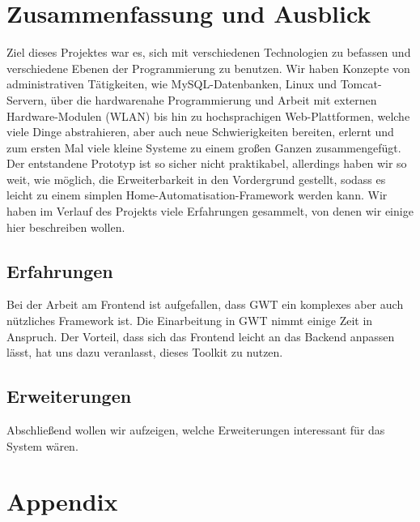 \documentclass[12pt,a4paper,twoside]{article}
\newcommand{\labelSec}[1]{\label{sec:#1}}
\begin{document}
\section{Zusammenfassung und Ausblick} \labelSec{ausblick}
Ziel dieses Projektes war es, sich mit verschiedenen Technologien zu befassen und verschiedene Ebenen der Programmierung zu benutzen. Wir haben Konzepte von administrativen Tätigkeiten, wie MySQL-Datenbanken, Linux und Tomcat-Servern, über die hardwarenahe Programmierung und Arbeit mit externen Hardware-Modulen (WLAN) bis hin zu hochsprachigen Web-Plattformen, welche viele Dinge abstrahieren, aber auch neue Schwierigkeiten bereiten, erlernt und zum ersten Mal viele kleine Systeme zu einem großen Ganzen zusammengefügt. Der entstandene Prototyp ist so sicher nicht praktikabel, allerdings haben wir so weit, wie möglich, die Erweiterbarkeit in den Vordergrund gestellt, sodass es leicht zu einem simplen Home-Automatisation-Framework werden kann. Wir haben im Verlauf des Projekts viele Erfahrungen gesammelt, von denen wir einige hier beschreiben wollen.
\subsection{Erfahrungen}
Bei der Arbeit am Frontend ist aufgefallen, dass GWT ein komplexes aber auch nützliches Framework ist. Die Einarbeitung in GWT nimmt einige Zeit in Anspruch. Der Vorteil, dass sich das Frontend leicht an das Backend anpassen lässt, hat uns dazu veranlasst, dieses Toolkit zu nutzen.

\subsection{Erweiterungen}
Abschließend wollen wir aufzeigen, welche Erweiterungen interessant für das System wären. 

\clearpage

\section{Appendix}




\end{document}
